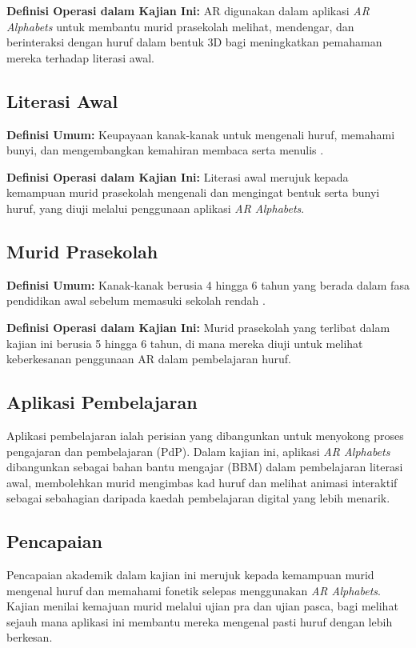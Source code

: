 \textbf{Definisi Operasi dalam Kajian Ini:} AR digunakan dalam aplikasi \emph{AR Alphabets} untuk membantu murid prasekolah melihat, mendengar, dan berinteraksi dengan huruf dalam bentuk 3D bagi meningkatkan pemahaman mereka terhadap literasi awal.

\subsection{Literasi Awal}
\textbf{Definisi Umum:} Keupayaan kanak-kanak untuk mengenali huruf, memahami bunyi, dan mengembangkan kemahiran membaca serta menulis \cite{mayo2019}.

\textbf{Definisi Operasi dalam Kajian Ini:} Literasi awal merujuk kepada kemampuan murid prasekolah mengenali dan mengingat bentuk serta bunyi huruf, yang diuji melalui penggunaan aplikasi \emph{AR Alphabets}.

\subsection{Murid Prasekolah}
\textbf{Definisi Umum:} Kanak-kanak berusia 4 hingga 6 tahun yang berada dalam fasa pendidikan awal sebelum memasuki sekolah rendah \cite{unesco2022}.

\textbf{Definisi Operasi dalam Kajian Ini:} Murid prasekolah yang terlibat dalam kajian ini berusia 5 hingga 6 tahun, di mana mereka diuji untuk melihat keberkesanan penggunaan AR dalam pembelajaran huruf.

\subsection{Aplikasi Pembelajaran}
Aplikasi pembelajaran ialah perisian yang dibangunkan untuk menyokong proses pengajaran dan pembelajaran (PdP). Dalam kajian ini, aplikasi \emph{AR Alphabets} dibangunkan sebagai bahan bantu mengajar (BBM) dalam pembelajaran literasi awal, membolehkan murid mengimbas kad huruf dan melihat animasi interaktif sebagai sebahagian daripada kaedah pembelajaran digital yang lebih menarik.

\subsection{Pencapaian}
Pencapaian akademik dalam kajian ini merujuk kepada kemampuan murid mengenal huruf dan memahami fonetik selepas menggunakan \emph{AR Alphabets}. Kajian menilai kemajuan murid melalui ujian pra dan ujian pasca, bagi melihat sejauh mana aplikasi ini membantu mereka mengenal pasti huruf dengan lebih berkesan.



